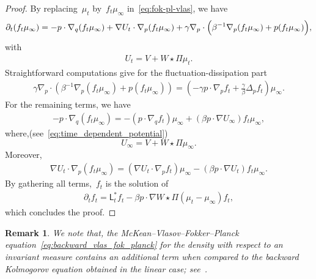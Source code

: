 \documentclass[onefignum,onetabnum]{siamart251216} %
\newcommand{\mescin}{\mu}
\newcommand{\projp}{\Pi}
\newcommand{\gennonlin}[1]{\mathsf{L}_{#1}}
\theoremstyle{plain}
\newtheorem{remark}[theorem]{Remark}
\numberwithin{equation}{section}
\numberwithin{theorem}{section}
\begin{document}
\begin{proof}
    By replacing~$\mescin_t$ by~$f_t\mescin_\infty$ in~\eqref{eq:fok-pl-vlas}, we have
\begin{align*}
    \partial_t (f_t\mescin_\infty) = -p\cdot \nabla_q (f_t\mescin_\infty) + \nabla U_t\cdot \nabla_p (f_t\mescin_\infty) + \gamma \nabla_p\cdot \Bigl(\beta^{-1}\nabla_p(f_t\mescin_\infty)+p(f_t\mescin_\infty)\Bigr),
\end{align*}
with
\begin{align}
    \label{eq:time_dependent_potential}
    U_t = V + W \star \projp \mescin_t.
\end{align}
Straightforward computations give for the fluctuation-dissipation part
\begin{align*}
    \gamma \nabla_p\cdot (\beta^{-1}\nabla_p(f_t\mescin_\infty)+p(f_t\mescin_\infty)) = \left(-\gamma p\cdot \nabla_p f_t +\frac{\gamma}{\beta}\Delta_p f_t\right)\mescin_\infty.
\end{align*}
For the remaining terms, we have
\begin{align*}
    -p\cdot \nabla_q (f_t\mescin_\infty) = -(p\cdot\nabla_q f_t)\mescin_\infty +(\beta p\cdot \nabla U_\infty )f_t\mescin_\infty,
\end{align*}
where,(see~\eqref{eq:time_dependent_potential})
\begin{equation}\label{eq:inf_potential}
U_\infty = V+ W \star \projp \mescin_\infty.
\end{equation}
Moreover,
\begin{align*}
    \nabla U_t\cdot \nabla_p (f_t\mescin_\infty) =( \nabla U_t \cdot \nabla_p f_t)\mescin_\infty - (\beta p\cdot\nabla U_t )f_t\mescin_\infty.
\end{align*}
By gathering all terms,~$f_t$ is the solution of
\begin{align*}
    \partial_t f_t =  \gennonlin{t}^* f_t -  \beta p\cdot\nabla W \star \projp (\mescin_t - \mescin_\infty) f_t,
\end{align*}
which concludes the proof.
\end{proof}

\begin{remark}
We note that, the McKean--Vlasov--Fokker--Planck equation~\eqref{eq:backward_vlas_fok_planck} for the density with respect to an invariant measure contains an additional term when compared to the backward Kolmogorov equation obtained in the linear case; see~\cite[Sec. 6.1]{PavliotisStochasticProcesses2014}.
\end{remark}
\end{document}
